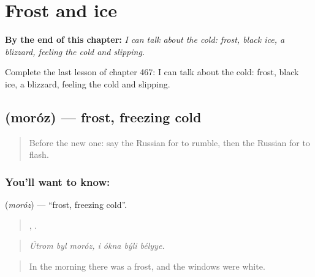 
\chapter{Frost and ice}
\label{ch:ru-frost-and-ice}

\begin{chapteropening}
\textbf{By the end of this chapter:} \emph{I can talk about the cold: frost, black ice, a blizzard, feeling the cold and slipping.}

Complete the last lesson of chapter 467: I can talk about the cold: frost, black ice, a blizzard, feeling the cold and slipping.
\end{chapteropening}

\section[\texorpdfstring{\ru{мороз} (moróz)}{мороз (moróz)}]{ (moróz) — frost, freezing cold}

\label{lesson:RU-C467-moroz}



\begin{quote}
Before the new one: say the Russian for to rumble, then the Russian for to flash.
\end{quote}

\subsection*{You'll want to know: }
\textbf{} (\emph{moróz}) — \textquotedblleft{}frost, freezing cold\textquotedblright{}.

\begin{quote}
  ,    .
\end{quote}

\begin{quote}
\emph{Útrom byl moróz, i ókna býli bélyye.}
\end{quote}

\begin{quote}
In the morning there was a frost, and the windows were white.
\end{quote}

